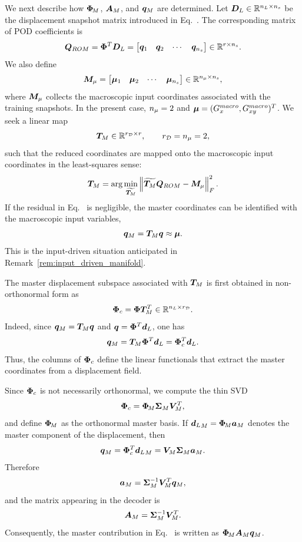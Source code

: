 \documentclass[11pt,a4paper]{article}
\begin{document}
We next describe how $\bm{\Phi}_{\!M}$, $\bm{A}_{M}$, and $\bm{q}_M$ are determined. Let
$\bm{D}_L\in\mathbb{R}^{n_L\times n_s}$ be the displacement snapshot matrix
introduced in Eq.~. The corresponding matrix of POD
coefficients is
\[
    \bm{Q}_{ROM}
    =
    \bm{\Phi}^T \bm{D}_L
    =
    \begin{bmatrix}
    \bm{q}_1 & \bm{q}_2 & \cdots & \bm{q}_{n_s}
    \end{bmatrix}
    \in\mathbb{R}^{r\times n_s}.
\]
We also define
\[
    \bm{M}_{\mu}
    =
    \begin{bmatrix}
    \bm{\mu}_1 & \bm{\mu}_2 & \cdots & \bm{\mu}_{n_s}
    \end{bmatrix}
    \in\mathbb{R}^{n_{\mu}\times n_s},
\]
where $\bm{M}_{\mu}$ collects the macroscopic input coordinates associated with the
training snapshots. In the present case, $n_{\mu}=2$ and
$\bm{\mu}=(G_x^{macro},G_{xy}^{macro})^T$. We seek a linear map
\[
    \bm{T}_{M}\in\mathbb{R}^{r_{\mathcal{D}}\times r},
    \qquad
    r_{\mathcal{D}}=n_{\mu}=2,
\]
such that the reduced coordinates are mapped onto the macroscopic input
coordinates in the least-squares sense:
\begin{equation}
\label{eq:least_squares_master_coordinates}
    \bm{T}_{M}
    =
    \arg\min_{\widetilde{\bm{T}_{M}}}
    \left\|
    \widetilde{\bm{T}_{M}}\bm{Q}_{ROM}-\bm{M}_{\mu}
    \right\|_F^2 .
\end{equation}
If the residual in Eq.~ is
negligible, the master coordinates can be identified with the macroscopic
input variables,
\begin{equation}
\label{eq:inpdriven}
    \bm{q}_M=\bm{T}_{M}\bm{q}\approx\bm{\mu} .
\end{equation}
This is the input-driven situation anticipated in
Remark~\ref{rem:input_driven_manifold}.




The master displacement subspace associated with $\bm{T}_{M}$ is first obtained in
non-orthonormal form as
\begin{equation}
\label{eq:Phic_definition}
    \bm{\Phi}_{c}
    =
    \bm{\Phi}\bm{T}_{M}^T
    \in\mathbb{R}^{n_L\times r_{\mathcal{D}}}.
\end{equation}
Indeed, since $\bm{q}_M=\bm{T}_{M}\bm{q}$ and $\bm{q}=\bm{\Phi}^T\bm{d}_L$, one has
\[
    \bm{q}_M
    =
    \bm{T}_{M}\bm{\Phi}^T\bm{d}_L
    =
    \bm{\Phi}_{c}^T\bm{d}_L .
\]
Thus, the columns of $\bm{\Phi}_{c}$ define the linear functionals that extract the
master coordinates from a displacement field.

Since $\bm{\Phi}_{c}$ is not necessarily orthonormal, we compute the thin SVD
\[
    \bm{\Phi}_{c}=\bm{\Phi}_{\!M}\bm{\Sigma}_{M}\bm{V}_{M}^T,
\]
and define $\bm{\Phi}_{\!M}$ as the orthonormal master basis. If
${\bm{d}_L}_M=\bm{\Phi}_{\!M}\bm{a}_M$ denotes the master component of the displacement, then
\[
    \bm{q}_M
    =
    \bm{\Phi}_{c}^T{\bm{d}_L}_M
    =
    \bm{V}_{M}\bm{\Sigma}_{M}\bm{a}_M .
\]
Therefore
\[
    \bm{a}_M
    =
    \bm{\Sigma}_{M}^{-1}\bm{V}_{M}^T\bm{q}_M,
\]
and the matrix appearing in the decoder is
\begin{equation}
\label{eq:Am_definition}
    \bm{A}_{M}
    =
    \bm{\Sigma}_{M}^{-1}\bm{V}_{M}^T .
\end{equation}
Consequently, the master contribution in
Eq.~ is written as
$\bm{\Phi}_{\!M}\bm{A}_{M}\bm{q}_M$.
\end{document}
